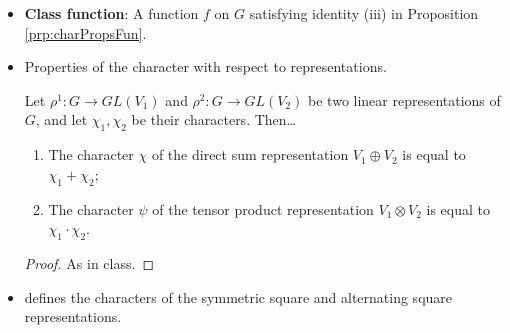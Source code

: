 \documentclass[../notes.tex]{subfiles}
\begin{document}
\begin{itemize}
\begin{proposition}
\begin{proof}
\begin{equation*}
                = \tr(\rho_s)^*
                = \chi(s)^*
            \end{equation*}
            \underline{(iii)}: This follows directly from the fact that the trace is invariant under choice of basis. Alternatively (and more explicitly), we may put $u=\rho_t\rho_s$ and $v=\rho_{t^{-1}}$ and use the formula $\tr(ab)=\tr(ba)$\footnote{See Theorem 10.4 of \textcite{bib:Axler}.} as follows.
            \begin{equation*}
                \chi(tst^{-1}) = \tr(\rho_{tst^{-1}})
                = \tr(\rho_t\rho_s\rho_{t^{-1}})
                = \tr(uv)
                = \tr(vu)
                = \tr(\rho_{t^{-1}}\rho_t\rho_s)
                = \tr(\rho_s)
                = \chi(s)
            \end{equation*}
        \end{proof}
    \end{proposition}
    \item \textbf{Class function}: A function $f$ on $G$ satisfying identity (iii) in Proposition \ref{prp:charPropsFun}.
    \item Properties of the character with respect to representations.
    \begin{proposition}\label{prp:charPropsSumProd}
        Let $\rho^1:G\to GL(V_1)$ and $\rho^2:G\to GL(V_2)$ be two linear representations of $G$, and let $\chi_1,\chi_2$ be their characters. Then\dots
        \begin{enumerate}[label={\textup{(\roman*)}}]
            \item The character $\chi$ of the direct sum representation $V_1\oplus V_2$ is equal to $\chi_1+\chi_2$;
            \item The character $\psi$ of the tensor product representation $V_1\otimes V_2$ is equal to $\chi_1\cdot\chi_2$.
        \end{enumerate}
        \begin{proof}
            As in class.
        \end{proof}
    \end{proposition}
    \item \textcite{bib:Serre} defines the characters of the symmetric square and alternating square representations.
\end{itemize}
\end{document}
